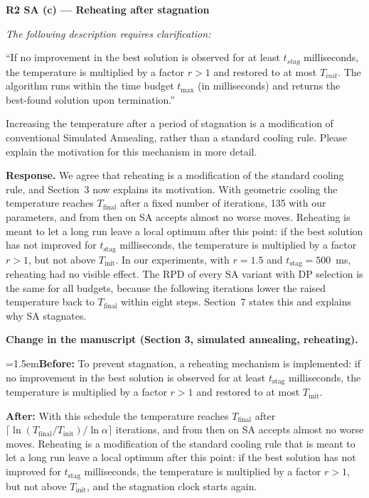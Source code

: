 \documentclass[12pt]{article}
\newenvironment{rc}[1]{\par\medskip\noindent\textbf{#1}\par\nopagebreak\noindent\itshape\renewcommand{\emph}[1]{\textbf{##1}}\ignorespaces}{\par}
\newcommand{\answer}[1]{\par\smallskip\noindent\textbf{Response.} #1\par}
\newcommand{\change}[3]{\par\smallskip\noindent\textbf{Change in the manuscript (#1).}\par
  {\leftskip=1.5em\noindent\textbf{Before:} #2\par\noindent\textbf{After:} #3\par}}
\begin{document}
\begin{rc}{R2 SA (c) --- Reheating after stagnation}
The following description requires clarification:

``If no improvement in the best solution is observed for at least $t_{stag}$ milliseconds, the temperature is multiplied by a factor $r>1$ and restored to at most $T_{init}$. The algorithm runs within the time budget $t_{\max}$ (in milliseconds) and returns the best-found solution upon termination.''

Increasing the temperature after a period of stagnation is a modification of conventional Simulated Annealing, rather than a standard cooling rule. Please explain the motivation for this mechanism in more detail.
\end{rc}
\answer{We agree that reheating is a modification of the standard cooling rule, and Section~3 now explains its motivation. With geometric cooling the temperature reaches $T_{\text{final}}$ after a fixed number of iterations, 135 with our parameters, and from then on SA accepts almost no worse moves. Reheating is meant to let a long run leave a local optimum after this point: if the best solution has not improved for $t_{\text{stag}}$ milliseconds, the temperature is multiplied by a factor $r>1$, but not above $T_{\text{init}}$. In our experiments, with $r=1.5$ and $t_{\text{stag}}=500$~ms, reheating had no visible effect. The RPD of every SA variant with DP selection is the same for all budgets, because the following iterations lower the raised temperature back to $T_{\text{final}}$ within eight steps. Section~7 states this and explains why SA stagnates.}
\change{Section 3, simulated annealing, reheating}{To prevent stagnation, a reheating mechanism is implemented: if no improvement in the best solution is observed for at least $t_{\text{stag}}$ milliseconds, the temperature is multiplied by a factor $r > 1$ and restored to at most $T_{\text{init}}$.}{With this schedule the temperature reaches $T_{\text{final}}$ after $\lceil\ln(T_{\text{final}}/T_{\text{init}})/\ln\alpha\rceil$ iterations, and from then on SA accepts almost no worse moves. Reheating is a modification of the standard cooling rule that is meant to let a long run leave a local optimum after this point: if the best solution has not improved for $t_{\text{stag}}$ milliseconds, the temperature is multiplied by a factor $r>1$, but not above $T_{\text{init}}$, and the stagnation clock starts again.}
\end{document}
